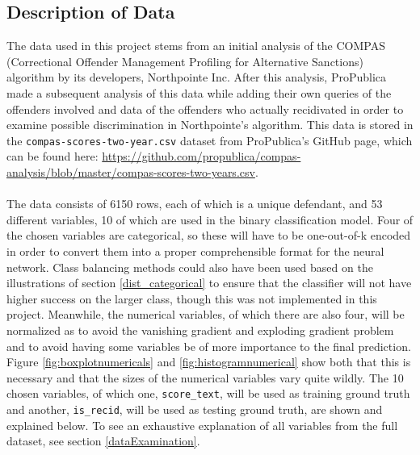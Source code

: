 \documentclass[11pt, fleqn, titlepage]{article}
\begin{document}
	\subsection{Description of Data} \label{dataDescription}
	The data used in this project stems from an initial analysis of the COMPAS (Correctional Offender Management Profiling for Alternative Sanctions) algorithm by its developers, Northpointe Inc. After this analysis, ProPublica made a subsequent analysis of this data while adding their own queries of the offenders involved and data of the offenders who actually recidivated in order to examine possible discrimination in Northpointe's algorithm. This data is stored in the \texttt{compas-scores-two-year.csv} dataset from ProPublica's GitHub page, which can be found here: \url{https://github.com/propublica/compas-analysis/blob/master/compas-scores-two-years.csv}. \\\\
	\noindent The data consists of 6150 rows, each of which is a unique defendant, and 53 different variables, 10 of which are used in the binary classification model. Four of the chosen variables are categorical, so these will have to be one-out-of-k encoded in order to convert them into a proper comprehensible format for the neural network. Class balancing methods could also have been used based on the illustrations of section \ref{dist_categorical} to ensure that the classifier will not have higher success on the larger class, though this was not implemented in this project. Meanwhile, the numerical variables, of which there are also four, will be normalized as to avoid the vanishing gradient and exploding gradient problem and to avoid having some variables be of more importance to the final prediction. Figure \ref{fig:boxplotnumericals} and \ref{fig:histogramnumerical} show both that this is necessary and that the sizes of the numerical variables vary quite wildly.
	The 10 chosen variables, of which one, \texttt{score\_text}, will be used as training ground truth and another, \texttt{is\_recid}, will be used as testing ground truth, are shown and explained below. To see an exhaustive explanation of all variables from the full dataset, see section \ref{dataExamination}.
	
\end{document}
